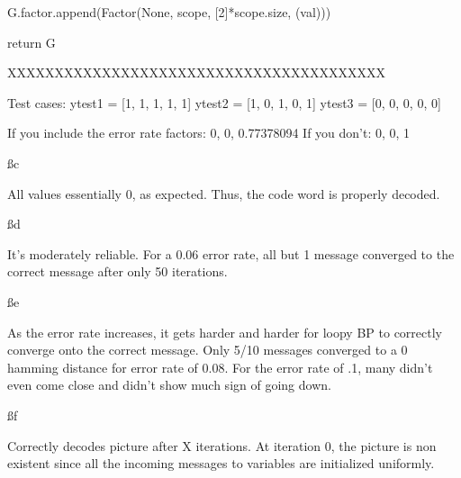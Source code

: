         G.factor.append(Factor(None, scope, [2]*scope.size, (val)))

    return G
    
XXXXXXXXXXXXXXXXXXXXXXXXXXXXXXXXXXXXXXXX

Test cases:
ytest1 = [1, 1, 1, 1, 1]
ytest2 = [1, 0, 1, 0, 1]
ytest3 = [0, 0, 0, 0, 0]

If you include the error rate factors:
0, 0, 0.77378094
If you don't: 
0, 0, 1

\ss c

All values essentially 0, as expected. Thus, the code word is properly decoded.


\ss d

It's moderately reliable. For a 0.06 error rate, all but 1 message converged to the correct message after only 50 iterations.


\ss e

As the error rate increases, it gets harder and harder for loopy BP to correctly converge onto the correct message. Only 5/10 messages converged to a 0 hamming distance for error rate of 0.08. For the error rate of .1, many didn't even come close and didn't show much sign of going down.


\ss f

Correctly decodes picture after X iterations. At iteration 0, the picture is non existent since all the incoming messages to variables are initialized uniformly.


